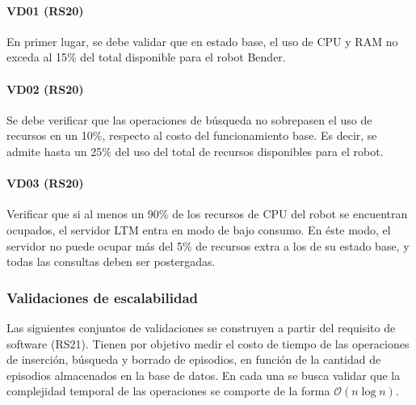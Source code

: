 \paragraph{VD01 (RS20)}
En primer lugar, se debe validar que en estado base, el uso de CPU y RAM no exceda al 15\% del total disponible para el robot Bender.

\paragraph{VD02 (RS20)}
Se debe verificar que las operaciones de búsqueda no sobrepasen el uso de recursos en un 10\%, respecto al costo del funcionamiento base. Es decir, se admite hasta un 25\% del uso del total de recursos disponibles para el robot.

\paragraph{VD03 (RS20)}
Verificar que si al menos un 90\% de los recursos de CPU del robot se encuentran ocupados, el servidor LTM entra en modo de bajo consumo. En éste modo, el servidor no puede ocupar más del 5\% de recursos extra a los de su estado base, y todas las consultas deben ser postergadas.


\subsubsection{Validaciones de escalabilidad}

Las siguientes conjuntos de validaciones se construyen a partir del requisito de software (RS21). Tienen por objetivo medir el costo de tiempo de las operaciones de inserción, búsqueda y borrado de episodios, en función de la cantidad de episodios almacenados en la base de datos. En cada una se busca validar que la complejidad temporal de las operaciones se comporte de la forma $\mathcal{O}(n\log{}n)$.




